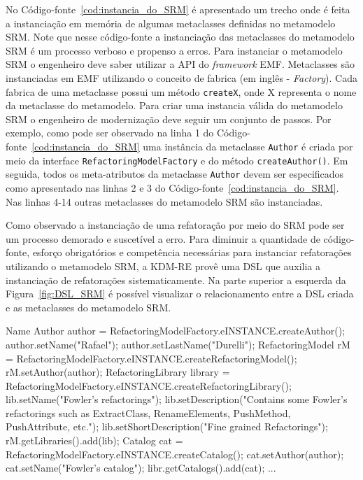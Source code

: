 No Código-fonte~\ref{cod:instancia_do_SRM} é apresentado um trecho onde é feita a instanciação em memória de algumas metaclasses definidas no metamodelo SRM. Note que nesse código-fonte a instanciação das metaclasses do metamodelo SRM é um processo verboso e propenso a erros. Para instanciar o metamodelo SRM o engenheiro deve saber utilizar a API do \textit{framework} EMF. Metaclasses são instanciadas em EMF utilizando o conceito de fabrica (em inglês - \textit{Factory}). Cada fabrica de uma metaclasse possui um método \texttt{createX}, onde X representa o nome da metaclasse do metamodelo. Para criar uma instancia válida do metamodelo SRM o engenheiro de modernização deve seguir um conjunto de passos. Por exemplo, como pode ser observado na linha 1 do Código-fonte~\ref{cod:instancia_do_SRM} uma instância da metaclasse \texttt{Author} é criada por meio da interface \texttt{RefactoringModelFactory} e do método \texttt{createAuthor()}. Em seguida, todos os meta-atributos da metaclasse \texttt{Author} devem ser especificados como apresentado nas linhas 2 e 3 do Código-fonte~\ref{cod:instancia_do_SRM}. Nas linhas 4-14 outras metaclasses do metamodelo SRM são instanciadas. 

Como observado a instanciação de uma refatoração por meio do SRM pode ser um processo demorado e suscetível a erro. Para diminuir a quantidade de código-fonte, esforço obrigatórios e competência necessárias para instanciar refatorações utilizando o metamodelo SRM, a KDM-RE provê uma DSL que auxilia a instanciação de refatorações sistematicamente. Na parte superior a esquerda da Figura~\ref{fig:DSL_SRM} é possível visualizar o relacionamento entre a DSL criada e as metaclasses do metamodelo SRM. 

\begin{codigo}[caption={[Instanciação do metamodelo SRM programaticamente.] Instanciação do metamodelo SRM.},escapeinside={(*@}{@*)}, basicstyle=\footnotesize, label={cod:instancia_do_SRM}, language=Java]{Name}
Author author = RefactoringModelFactory.eINSTANCE.createAuthor();
author.setName("Rafael");
author.setLastName("Durelli");
RefactoringModel rM = RefactoringModelFactory.eINSTANCE.createRefactoringModel();
rM.setAuthor(author);
RefactoringLibrary library = RefactoringModelFactory.eINSTANCE.createRefactoringLibrary();
lib.setName("Fowler's refactorings");
lib.setDescription("Contains some Fowler's refactorings such as ExtractClass, RenameElements, PushMethod, PushAttribute, etc.");
lib.setShortDescription("Fine grained Refactorings");
rM.getLibraries().add(lib);
Catalog cat = RefactoringModelFactory.eINSTANCE.createCatalog();
cat.setAuthor(author);
cat.setName("Fowler's catalog");
libr.getCatalogs().add(cat);
...
\end{codigo}

